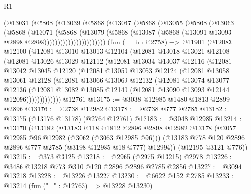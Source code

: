 \begin{lexlean}{R1}
\begin{coremodule}
                (@13031
                  (@5868
                    (@13039
                      (@5868
                        (@13047
                          (@5868
                            (@13055
                              (@5868
                                (@13063
                                  (@5868
                                    (@13071
                                      (@5868
                                        (@13079
                                          (@5868
                                            (@13087
                                              (@5868
                                                (@13091 @13093 @2898 @2898)))))))))))))))))))))))
    (fun (__b : @2758) =>
    @11901
      (@12083
        @12100
        (@12081
          @13010
          @13013
          @12104
          (@12081
            @13018
            @13021
            @12108
            (@12081
              @13026
              @13029
              @12112
              (@12081
                @13034
                @13037
                @12116
                (@12081
                  @13042
                  @13045
                  @12120
                  (@12081
                    @13050
                    @13053
                    @12124
                    (@12081
                      @13058
                      @13061
                      @12128
                      (@12081
                        @13066
                        @13069
                        @12132
                        (@12081
                          @13074
                          @13077
                          @12136
                          (@12081
                            @13082
                            @13085
                            @12140
                            (@12081 @13090 @13093 @12144 @12096)))))))))))))
    @12761
@13175 := @3038 @12985 @1480 @1813 @2899 @2896
@13176 := @2738 @12982
@13178 := @2738 @777 @2785
@13182 := @13175 (@13176 @13178) (@2764 @12761)
@13183 := @3048 @12985
@13214 := @13170
    (@13182
      (@13183
        @118
        @1812
        @2896
        @2898
        @12982
        @13178
        (@3057 @12985 @96 @12982 (@3062 (@3063 @12985 @96)))
        (@13183 @778 @120 @2896 @2896 @777 @2785 (@3198 @12985 @18 @777) @12994))
      (@12195 @3121 @776))
@13215 := @373 @3125
@13218 := @2965 (@2975 @13215) @2978
@13226 := @3486 @13218 @773 @310 @120 @2896 @2896 @2785 @2856
@13227 := @3094 @13218
@13228 := @13226 @13227
@13230 := @6622 @152 @2785
@13233 := @13214 (fun ("_" : @12763) => @13228 @13230)

\end{coremodule}
\end{lexlean}

